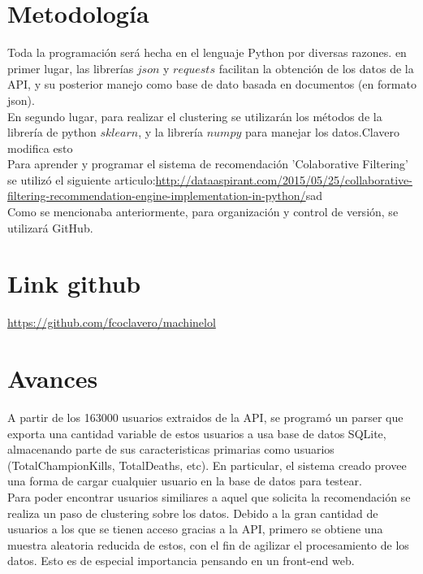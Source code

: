 \documentclass[letterpaper,11pt, spanish]{article}
\begin{document}
\section{Metodología}

Toda la programación será hecha en el lenguaje Python por diversas razones. en
primer lugar, las librerías $json$ y $requests$ facilitan la obtención de los
datos de la API, y su posterior manejo como base de dato basada en documentos
(en formato json).\\

En segundo lugar, para realizar el clustering se utilizarán
los métodos de la librería de python $sklearn$, y la librería $numpy$ para
manejar los datos.Clavero modifica esto \\

Para aprender y programar el sistema de recomendación 'Colaborative Filtering' se utilizó el siguiente articulo:\url{http://dataaspirant.com/2015/05/25/collaborative-filtering-recommendation-engine-implementation-in-python/}{sad}\\

Como se mencionaba anteriormente, para organización y control de versión, se
utilizará GitHub.

\section{Link github}
\url{https://github.com/fcoclavero/machinelol}

\section{Avances}
A partir de los 163000 usuarios extraidos de la API, se programó un parser que exporta una cantidad variable de estos usuarios a usa base de datos SQLite, almacenando parte de sus caracteristicas primarias como usuarios (TotalChampionKills, TotalDeaths, etc). En particular, el sistema creado provee una forma de cargar cualquier usuario en la base de datos para testear.\\

Para poder encontrar usuarios similiares a aquel que solicita la recomendación se realiza un paso de clustering sobre los datos. Debido a la gran cantidad de usuarios a los que se tienen acceso gracias a la API, primero se obtiene una muestra aleatoria reducida de estos, con el fin de agilizar el procesamiento de los datos. Esto es de especial importancia pensando en un front-end web. \\
\end{document}

